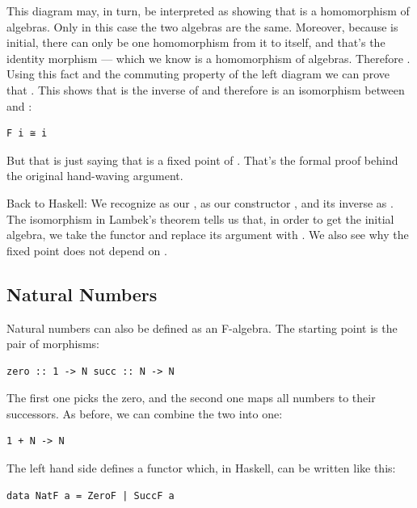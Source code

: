 This diagram may, in turn, be interpreted as showing that
 is a homomorphism of algebras. Only in this case the
two algebras are the same. Moreover, because  is
initial, there can only be one homomorphism from it to itself, and
that's the identity morphism  --- which we know is a
homomorphism of algebras. Therefore . Using this
fact and the commuting property of the left diagram we can prove that
. This shows that  is the inverse of
 and therefore  is an isomorphism between
 and :

\begin{verbatim}
F i ≅ i
\end{verbatim}

But that is just saying that  is a fixed point of .
That's the formal proof behind the original hand-waving argument.

Back to Haskell: We recognize  as our ,
 as our constructor , and its inverse as
. The isomorphism in Lambek's theorem tells us that, in
order to get the initial algebra, we take the functor  and
replace its argument  with . We also see why
the fixed point does not depend on .

\subsection{Natural Numbers}\label{natural-numbers}

Natural numbers can also be defined as an F-algebra. The starting point
is the pair of morphisms:

\begin{verbatim}
zero :: 1 -> N succ :: N -> N
\end{verbatim}

The first one picks the zero, and the second one maps all numbers to
their successors. As before, we can combine the two into one:

\begin{verbatim}
1 + N -> N
\end{verbatim}

The left hand side defines a functor which, in Haskell, can be written
like this:

\begin{verbatim}
data NatF a = ZeroF | SuccF a
\end{verbatim}

